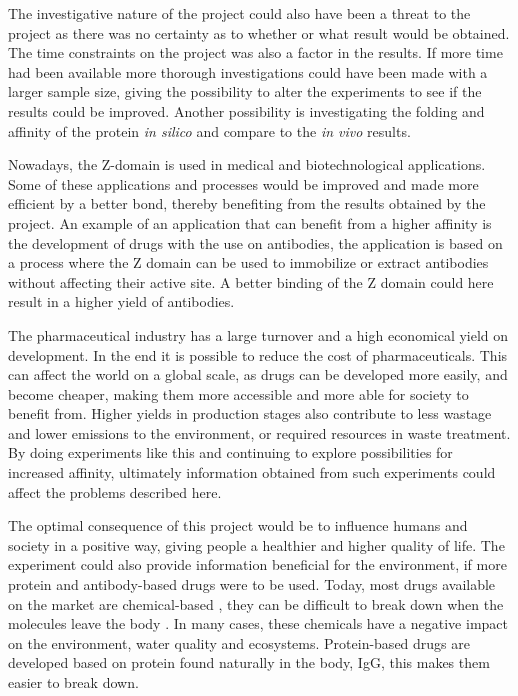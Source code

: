 \documentclass{article}
\begin{document}
\begin{multicols}{2}
	The investigative nature of the project could also have been a threat to the project as there was no certainty as to whether or what result would be obtained. The time constraints on the project was also a factor in the results. If more time had been available more thorough investigations could have been made with a larger sample size, giving the possibility to alter the experiments to see if the results could be improved. Another possibility is investigating the folding and affinity of the protein \textit{in silico} and compare to the \textit{in vivo} results.
	
	Nowadays, the Z-domain is used in medical and biotechnological applications. Some of these applications and processes would be improved and made more efficient by a better bond, thereby benefiting from the results obtained by the project. An example of an application that can benefit from a higher affinity is the development of drugs with the use on antibodies, the application is based on a process where the Z domain can be used to immobilize or extract antibodies without affecting their active site. A better binding of the Z domain could here result in a higher yield of antibodies. 
	
	The pharmaceutical industry has a large turnover and a high economical yield on development. In the end it is possible to reduce the cost of pharmaceuticals. This can affect the world on a global scale, as drugs can be developed more easily, and become cheaper, making them more accessible and more able for society to benefit from. Higher yields in production stages also contribute to less wastage and lower emissions to the environment, or required resources in waste treatment. By doing experiments like this and continuing to explore possibilities for increased affinity, ultimately information obtained from such experiments could affect the problems described here.
	
	The optimal consequence of this project would be to influence humans and society in a positive way, giving people a healthier and higher quality of life. The experiment could also provide information beneficial for the environment, if more protein and antibody-based drugs were to be used. Today, most drugs available on the market are chemical-based \cite{noauthor_ifpma_nodate}, they can be difficult to break down when the molecules leave the body \cite{noauthor_pharmaceuticals_nodate}. In many cases, these chemicals have a negative impact on the environment, water quality and ecosystems. Protein-based drugs are developed based on protein found naturally in the body, IgG, this makes them easier to break down.

	\end{multicols}
	\newpage
	
	
	
\end{document}
